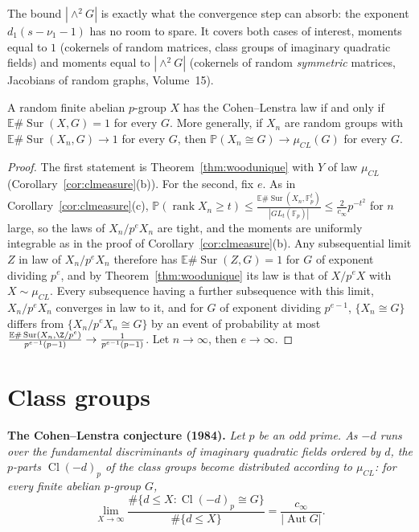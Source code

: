 The bound $|\wedge^2G|$ is exactly what the convergence step can absorb: the exponent $d_1(s-\nu_1-1)$ has no room to spare. It covers both cases of interest, moments equal to $1$ (cokernels of random matrices, class groups of imaginary quadratic fields) and moments equal to $|\wedge^2G|$ (cokernels of random \emph{symmetric} matrices, Jacobians of random graphs, Volume~15).

\begin{corollary}\label{cor:clcharacterize}
A random finite abelian $p$-group $X$ has the Cohen--Lenstra law if and only if $\mathbb E\#\operatorname{Sur}(X,G)=1$ for every $G$. More generally, if $X_n$ are random groups with $\mathbb E\#\operatorname{Sur}(X_n,G)\to1$ for every $G$, then $\mathbb P(X_n\cong G)\to\mu_{CL}(G)$ for every $G$.
\end{corollary}
\begin{proof}
The first statement is Theorem~\ref{thm:woodunique} with $Y$ of law $\mu_{CL}$ (Corollary~\ref{cor:clmeasure}(b)). For the second, fix $e$. As in Corollary~\ref{cor:clmeasure}(c), $\mathbb P(\operatorname{rank}X_n\ge t)\le\frac{\mathbb E\#\operatorname{Sur}(X_n,\mathbb F_p^t)}{|GL_t(\mathbb F_p)|}\le\frac2{c_\infty}p^{-t^2}$ for $n$ large, so the laws of $X_n/p^eX_n$ are tight, and the moments are uniformly integrable as in the proof of Corollary~\ref{cor:clmeasure}(b). Any subsequential limit $Z$ in law of $X_n/p^eX_n$ therefore has $\mathbb E\#\operatorname{Sur}(Z,G)=1$ for $G$ of exponent dividing $p^e$, and by Theorem~\ref{thm:woodunique} its law is that of $X/p^eX$ with $X\sim\mu_{CL}$. Every subsequence having a further subsequence with this limit, $X_n/p^eX_n$ converges in law to it, and for $G$ of exponent dividing $p^{e-1}$, $\{X_n\cong G\}$ differs from $\{X_n/p^eX_n\cong G\}$ by an event of probability at most $\frac{\mathbb E\#\operatorname{Sur}(X_n,\Z/p^e)}{p^{e-1}(p-1)}\to\frac1{p^{e-1}(p-1)}$. Let $n\to\infty$, then $e\to\infty$.
\end{proof}

\section{Class groups}

\medskip\noindent\textbf{The Cohen--Lenstra conjecture (1984).} \emph{Let $p$ be an odd prime. As $-d$ runs over the fundamental discriminants of imaginary quadratic fields ordered by $d$, the $p$-parts $\operatorname{Cl}(-d)_p$ of the class groups become distributed according to $\mu_{CL}$: for every finite abelian $p$-group $G$,
\[
\lim_{X\to\infty}\frac{\#\{d\le X:\operatorname{Cl}(-d)_p\cong G\}}{\#\{d\le X\}}=\frac{c_\infty}{|\operatorname{Aut}G|}.
\]}

